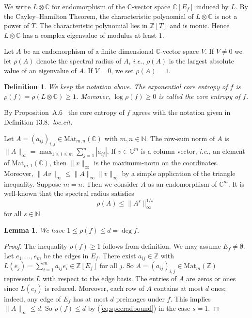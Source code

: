 \documentclass[12pt,oneside,a4]{amsart}
\newcommand{\IC}{\mathbb{C}}
\newcommand{\IN}{\mathbb{N}}
\newcommand{\IZ}{\mathbb{Z}}
\newcommand{\mat}[1]{\mathrm{Mat}_{#1}}
\newcounter{maincounter}
\numberwithin{maincounter}{section}
\numberwithin{equation}{section}
\newtheorem{lemma}[maincounter]{Lemma}
\newtheorem{defi}[maincounter]{Definition}
\renewcommand{\mat}{\mathrm{Mat}}
\begin{document}
We write $L\otimes \IC$ for  endomorphism of the
$\IC$-vector space $\IC[E_f]$  induced by $L$.
By the Cayley--Hamilton Theorem, the characteristic
polynomial of $L\otimes\IC$ is not a power of $T$. The characteristic
polynomial lies in $\IZ[T]$ and is monic. Hence $L\otimes\IC$
has a complex eigenvalue
of modulus at least $1$.

Let $A$ be an endomorphism of a finite dimensional $\IC$-vector space
$V$. 
If $V\not=0$ we let
$\rho(A)$ denote the spectral radius of $A$, \textit{i.e.}, $\rho(A)$
is the largest absolute value of an eigenvalue of $A$. If $V=0$, we
set $\rho(A)=1$.

\begin{defi}
  \label{def:entropy}
  We keep the notation above.  The exponential core entropy of $f$ is
  $\rho(f)=\rho(L\otimes\IC)\ge 1$. 
  Moreover, $\log \rho(f)\ge 0$ is called the core entropy of $f$.
\end{defi}

By Proposition~A.6~\cite{thurstonetal:degreed} the core entropy of $f$
agrees with the  notation given in Definition 13.8.~\textit{loc.cit.}

Let $A=(a_{ij})_{i,j}\in \mat_{m,n}(\IC)$ with $m,n\in\IN$. The
row-sum norm of $A$ is $\|A\|_\infty = \max_{1\le i \le m}
\sum_{j=1}^n |a_{ij}|$. If $v\in\IC^m$ is a column vector,
\textit{i.e.}, an element of $\mat_{m,1}(\IC)$, then $\|v\|_\infty$ is
the maximum-norm on the coordinates. Moreover, $\|Av\|_\infty \le
\|A\|_\infty \|v\|_\infty$ by a simple application of the triangle
inequality. Suppose $m=n$. Then we consider $A$ as an endomorphism of
$\IC^m$. It is well-known that the spectral radius satisfies
\begin{equation}
  \label{eq:specradbound}
  \rho(A) \le \|A^s\|_\infty^{1/s}
\end{equation}
for all $s\in\IN$. 

\begin{lemma}
  \label{lem:entropybound}
  We have $1\le \rho(f) \le d=\deg f$. 
\end{lemma}
\begin{proof}  
  The inequality $\rho(f)\ge 1$ follows from definition.
  We may assume $E_f\not=\emptyset$. 
  Let $e_1,\ldots,e_m$ be the edges in $E_f$.
  There exist $a_{ij}\in \IZ$ with
  $L(e_j) = \sum_{i=1}^m a_{ij} e_i\in\IZ[E_f]$ for all $j$. 
  So $A= (a_{ij})_{i,j}\in \mat_{m}(\IZ)$ represents $L$ with respect
  to
  the edge basis.  The entries of $A$ are zeros or ones since $L(e_j)$
  is reduced. Moreover, each row of
  $A$ contains at most $d$ ones; indeed, any edge of $E_f$ has at most
  $d$ preimages under $f$.
  This implies $\|A\|_\infty\le d$.
  So $\rho(f) \le d$ by (\ref{eq:specradbound}) in the case $s=1$.
\end{proof}
\end{document}
